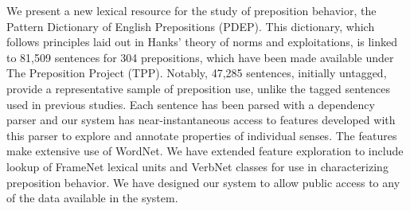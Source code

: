 We present a new lexical resource for the study of preposition behavior, the Pattern Dictionary of English Prepositions (PDEP). This dictionary, which follows principles laid out in Hanks' theory of norms and exploitations, is linked to 81,509 sentences for 304 prepositions, which have been made available under The Preposition Project (TPP). Notably, 47,285 sentences, initially untagged, provide a representative sample of preposition use, unlike the tagged sentences used in previous studies. Each sentence has been parsed with a dependency parser and our system has near-instantaneous access to features developed with this parser to explore and annotate properties of individual senses. The features make extensive use of WordNet. We have extended feature exploration to include lookup of FrameNet lexical units and VerbNet classes for use in characterizing preposition behavior. We have designed our system to allow public access to any of the data available in the system.
